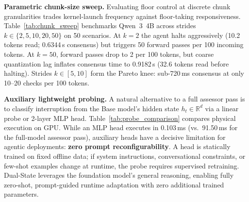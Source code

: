\documentclass{article}
\begin{document}
\textbf{Parametric chunk-size sweep.} Evaluating floor control at discrete chunk granularities trades kernel-launch frequency against floor-taking responsiveness. Table~\ref{tab:chunk_sweep} benchmarks Qwen~3~4B across strides $k \in \{2, 5, 10, 20, 50\}$ on 50 scenarios. At $k=2$ the agent halts aggressively (10.2 tokens read; 0.6344\,s consensus) but triggers 50 forward passes per 100 incoming tokens. At $k=50$, forward passes drop to 2 per 100 tokens, but coarse quantization lag inflates consensus time to 0.9182\,s (32.6 tokens read before halting). Strides $k \in [5, 10]$ form the Pareto knee: sub-720\,ms consensus at only 10--20 checks per 100 tokens.

\begin{table}[h]
\centering
\caption{\textbf{Chunk-size ($k$) ablation (Qwen 3 4B, 50 scenarios).}}
\label{tab:chunk_sweep}
\vspace{0.2cm}
\end{table}

\textbf{Auxiliary lightweight probing.} A natural alternative to a full assessor pass is to classify interruption from the Base model's hidden state $h_t \in \mathbb{R}^d$ via a linear probe or 2-layer MLP head. Table~\ref{tab:probe_comparison} compares physical execution on GPU. While an MLP head executes in 0.103\,ms (vs.\ 91.50\,ms for the full-model assessor pass), auxiliary heads have a decisive limitation for agentic deployments: \textbf{zero prompt reconfigurability}. A head is statically trained on fixed offline data; if system instructions, conversational constraints, or few-shot examples change at runtime, the probe requires supervised retraining. Dual-State leverages the foundation model's general reasoning, enabling fully zero-shot, prompt-guided runtime adaptation with zero additional trained parameters.
\end{document}
